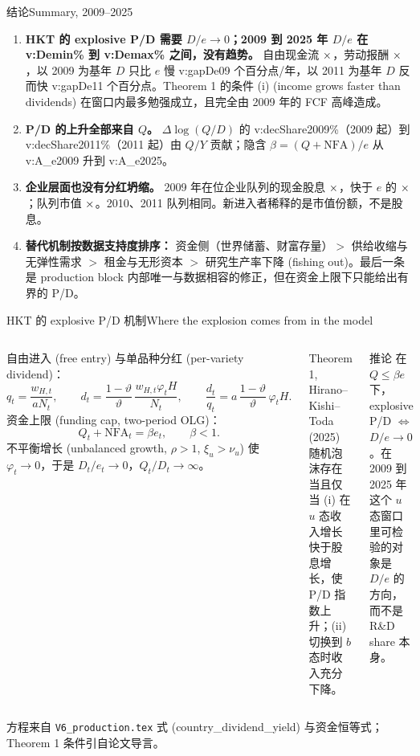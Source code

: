 \documentclass[aspectratio=169,10pt]{beamer}
\newcommand{\val}[1]{\csname v:#1\endcsname}
\newcommand{\src}[1]{\vfill{\scriptsize\textcolor{muted}{#1}}}
\newcommand{\en}[1]{\textcolor{inksec}{#1}}
\begin{document}
\begin{frame}{结论}{Summary, 2009–2025}
\begin{enumerate}\setlength{\itemsep}{0.3cm}
\item \textbf{HKT 的 explosive P/D 需要 $D/e\to0$；2009 到 2025 年 $D/e$ 在 \val{Demin}\% 到 \val{Demax}\% 之间，没有趋势。} 自由现金流 $\times\val{multFCF}$，劳动报酬 $\times\val{multCOMP}$，以 2009 为基年 $D$ 只比 $e$ 慢 \val{gapDe09} 个百分点/年，以 2011 为基年 $D$ 反而快 \val{gapDe11} 个百分点。Theorem 1 的条件 (i) \en{(income grows faster than dividends)} 在窗口内最多勉强成立，且完全由 2009 年的 FCF 高峰造成。
\item \textbf{P/D 的上升全部来自 $Q$。} $\Delta\log(Q/D)$ 的 \val{decShare2009}\%（2009 起）到 \val{decShare2011}\%（2011 起）由 $Q/Y$ 贡献；隐含 $\beta=(Q+\mathrm{NFA})/e$ 从 \val{A_e2009} 升到 \val{A_e2025}。
\item \textbf{企业层面也没有分红坍缩。} 2009 年在位企业队列的现金股息 $\times\val{c2009dvt_mult}$，快于 $e$ 的 $\times\val{c2009comp_mult}$；队列市值 $\times\val{c2009me_mult}$。2010、2011 队列相同。新进入者稀释的是市值份额，不是股息。
\item \textbf{替代机制按数据支持度排序：} 资金侧（世界储蓄、财富存量）$>$ 供给收缩与无弹性需求 $>$ 租金与无形资本 $>$ 研究生产率下降 \en{(fishing out)}。最后一条是 production block 内部唯一与数据相容的修正，但在资金上限下只能给出有界的 P/D。
\end{enumerate}
\end{frame}

\begin{frame}{HKT 的 explosive P/D 机制}{Where the explosion comes from in the model}
\begin{columns}[T]
{\small 自由进入 \en{(free entry)} 与单品种分红 \en{(per-variety dividend)}：}
\[
q_{t}=\frac{w_{H,t}}{aN_t},\qquad d_t=\frac{1-\vartheta}{\vartheta}\,\frac{w_{H,t}\varphi_tH}{N_t},\qquad
\frac{d_t}{q_t}=a\,\frac{1-\vartheta}{\vartheta}\,\varphi_tH .
\]
{\small 资金上限 \en{(funding cap, two-period OLG)}：}
\[
Q_t+\mathrm{NFA}_t=\beta e_t,\qquad \beta<1 .
\]
{\small 不平衡增长 \en{(unbalanced growth, $\rho>1$, $\xi_u>\nu_u$)} 使 $\varphi_t\to0$，于是 $D_t/e_t\to0$，$Q_t/D_t\to\infty$。}
\begin{block}{Theorem 1, Hirano–Kishi–Toda (2025)}
\small 随机泡沫存在当且仅当 (i) 在 $u$ 态收入增长快于股息增长，使 P/D 指数上升；(ii) 切换到 $b$ 态时收入充分下降。
\end{block}
\begin{block}{推论}
\small 在 $Q\le\beta e$ 下，explosive P/D $\Longleftrightarrow$ $D/e\to0$。在 2009 到 2025 年这个 $u$ 态窗口里可检验的对象是 $D/e$ 的方向，而不是 R\&D share 本身。
\end{block}
\end{columns}
\src{方程来自 \texttt{V6\_production.tex} 式 (country\_dividend\_yield) 与资金恒等式；Theorem 1 条件引自论文导言。}
\end{frame}
\end{document}
